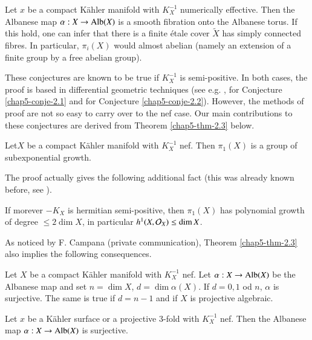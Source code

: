 \begin{secconj}\label{chap5-conje-2.2}
Let $x$ be a compact K\"ahler manifold with $K_{X}^{-1}$ numerically effective. Then the Albanese map $\alpha : X\rightarrow \operatorname{Alb}(X)$ is a smooth fibration onto the Albanese torus. If this hold, one can infer that there is a finite
\'etale cover $\widetilde{X}$ has simply connected fibres. In particular, $\pi_{i}(X)$ would almost abelian (namely an extension of a finite group by a free abelian group).

These conjectures are known to be true if $K_{X}^{-1}$ is semi-positive. In both cases, the proof is based in differential geometric techniques (see e.g. \cite{chap5-keyBi63}, \cite{chap5-keyHK78} for Conjecture \ref{chap5-conje-2.1} and \cite{chap5-keyLi71} for Conjecture \ref{chap5-conje-2.2}). However, the methods of proof are not so easy to carry over to the nef case. Our main contributions to these conjectures are derived from Theorem \ref{chap5-thm-2.3} below.
\end{secconj}

\begin{secthm}\label{chap5-thm-2.3}
Let\pageoriginale $X$ be a compact K\"ahler manifold with $K_{X}^{-1}$ nef. Then $\pi_{1}(X)$ is a group of subexponential growth.
\end{secthm}

The proof actually gives the following additional fact (this was already known before, see \cite{chap5-keyBi63}).

\begin{seccoro}\label{chap5-coro-2.4}
If morever $-K_{X}$ is hermitian semi-positive, then $\pi_{1}(X)$ has polynomial growth of degree $\leq 2 \dim X$, in particular $h^{1}(X, \mathcal{O}_{X}) \leq \dim X$.
\end{seccoro}

As noticed by F. Campana (private communication), Theorem \ref{chap5-thm-2.3} also implies the following consequences. 

\begin{seccoro}\label{chap5-coro-2.5}
Let $X$ be a compact K\"ahler manifold with $K_{X}^{-1}$ nef. Let $\alpha : X\rightarrow \operatorname{Alb}(X)$ be the Albanese map and set $n=\dim X$, $d=\dim \alpha(X)$. If $d=0, 1$ od $n$, $\alpha$ is surjective. The same is true if $d = n-1$ and if $X$ is projective algebraic. 
\end{seccoro}

\begin{seccoro}\label{chap5-coro-2.6}
Let $x$ be a K\"ahler surface or a projective 3-fold with $K_{X}^{-1}$ nef. Then the Albanese map $\alpha : X\rightarrow \operatorname{Alb}(X)$ is surjective.
\end{seccoro}

